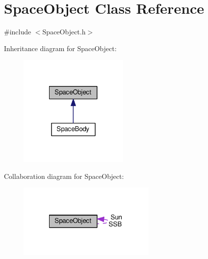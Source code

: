 \hypertarget{class_space_object}{\section{Space\+Object Class Reference}
\label{class_space_object}
}


{\ttfamily \#include $<$Space\+Object.\+h$>$}



Inheritance diagram for Space\+Object\+:\nopagebreak
\begin{figure}[H]
\begin{center}
\leavevmode
\includegraphics[width=152pt]{class_space_object__inherit__graph}
\end{center}
\end{figure}


Collaboration diagram for Space\+Object\+:\nopagebreak
\begin{figure}[H]
\begin{center}
\leavevmode
\includegraphics[width=191pt]{class_space_object__coll__graph}
\end{center}
\end{figure}
